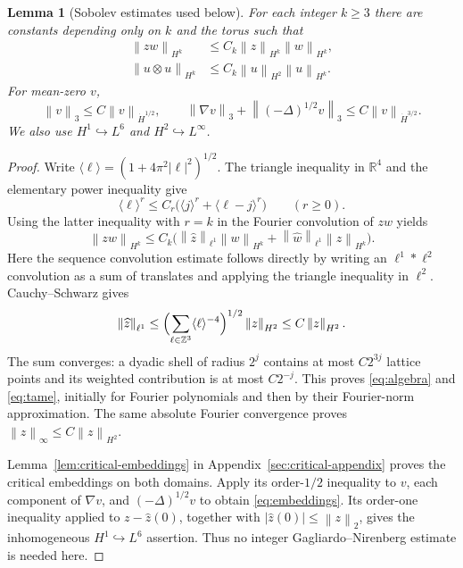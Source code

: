 \documentclass[11pt,a4paper]{article}
\newtheorem{lemma}[theorem]{Lemma}
\theoremstyle{definition}\newtheorem{definition}[theorem]{Definition}
\theoremstyle{remark}\newtheorem{remark}[theorem]{Remark}
\newcommand{\R}{\mathbb R}\newcommand{\TT}{\mathbb T^3}
\newcommand{\norm}[1]{\left\lVert#1\right\rVert}
\begin{document}
\begin{lemma}[Sobolev estimates used below]\label{lem:calculus}
For each integer $k\ge3$ there are constants depending only on $k$ and the torus such that
\begin{align}
 \norm{zw}_{H^k}&\le C_k\norm{z}_{H^k}\norm{w}_{H^k},\label{eq:algebra}\\
 \norm{u\otimes u}_{H^k}
 &\le C_k\norm{u}_{H^2}\norm{u}_{H^k}.\label{eq:tame}
\end{align}
For mean-zero $v$,
\begin{equation}\label{eq:embeddings}
 \norm{v}_3\le C\norm{v}_{\dot H^{1/2}},\qquad
 \norm{\nabla v}_3+\norm{(-\Delta)^{1/2}v}_3
       \le C\norm{v}_{\dot H^{3/2}}.
\end{equation}
We also use $H^1\hookrightarrow L^6$ and $H^2\hookrightarrow L^\infty$.
\end{lemma}
\begin{proof}
Write $\langle\ell\rangle=(1+4\pi^2|\ell|^2)^{1/2}$.
The triangle inequality in $\R^4$ and the elementary power inequality give
\[
 \langle\ell\rangle^r
 \le C_r\bigl(\langle j\rangle^r+\langle\ell-j\rangle^r\bigr)
 \qquad(r\ge0).
\]
Using the latter inequality with $r=k$ in the Fourier convolution of $zw$ yields
\[
 \norm{zw}_{H^k}\le C_k\bigl(
   \norm{\widehat z}_{\ell^1}\norm{w}_{H^k}
  +\norm{\widehat w}_{\ell^1}\norm{z}_{H^k}\bigr).
\]
Here the sequence convolution estimate follows directly by writing an
$\ell^1*\ell^2$ convolution as a sum of translates and applying the triangle
inequality in $\ell^2$. Cauchy--Schwarz gives
\[
 \norm{\widehat z}_{\ell^1}
 \le\Bigl(\sum_{\ell\in\mathbb Z^3}\langle\ell\rangle^{-4}\Bigr)^{1/2}
      \norm{z}_{H^2}\le C\norm{z}_{H^2}.
\]
The sum converges: a dyadic shell of radius $2^j$ contains at most $C2^{3j}$
lattice points and its weighted contribution is at most $C2^{-j}$.
This proves \eqref{eq:algebra} and \eqref{eq:tame}, initially for Fourier
polynomials and then by their Fourier-norm approximation. The same absolute
Fourier convergence proves $\norm{z}_\infty\le C\norm{z}_{H^2}$.

Lemma~\ref{lem:critical-embeddings} in Appendix~\ref{sec:critical-appendix}
proves the critical embeddings on both domains. Apply its order-$1/2$ inequality to $v$,
each component of $\nabla v$, and $(-\Delta)^{1/2}v$ to obtain
\eqref{eq:embeddings}. Its order-one inequality applied to $z-\widehat z(0)$,
together with $|\widehat z(0)|\le\norm{z}_2$, gives the inhomogeneous
$H^1\hookrightarrow L^6$ assertion. Thus no integer
Gagliardo--Nirenberg estimate is needed here.
\end{proof}
\end{document}
